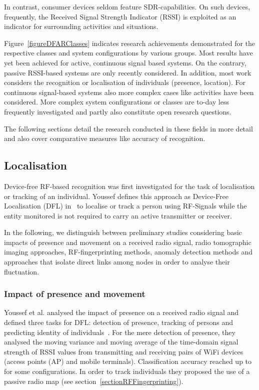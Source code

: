 \documentclass[journal]{IEEEtran}
\begin{document}
\begin{figure*}
In contrast, consumer devices seldom feature SDR-capabilities. 
On such devices, frequently, the Received Signal Strength Indicator (RSSI) is exploited as an indicator for surrounding activities and situations.

Figure~\ref{figureDFARClasses} indicates research achievements demonstrated for the respective classes and system configurations by various groups.
Most results have yet been achieved for active, continuous signal based systems. 
On the contrary, passive RSSI-based systems are only recently considered.
In addition, most work considers the recognition or localisation of individuals (presence, location). 
For continuous signal-based systems also more complex cases like activities have been considered. 
More complex system configurations or classes are to-day less frequently investigated and partly also constitute open research questions.

The following sections detail the research conducted in these fields in more detail and also cover comparative measures like accuracy of recognition.

\subsection{Localisation}
Device-free RF-based recognition was first investigated for the task of localisation or tracking of an individual.
Youssef defines this approach as Device-Free Localisation (DFL) in~\cite{Pervasive_Youssef_2007} to localise or track a person using RF-Signals while the entity monitored is not required to carry an active transmitter or receiver.

In the following, we distinguish between preliminary studies considering basic impacts of presence and movement on a received radio signal, radio tomographic imaging approaches, RF-fingerprinting methods, anomaly detection methods and approaches that isolate direct links among nodes in order to analyse their fluctuation.

\subsubsection{Impact of presence and movement}
Youssef et al. analysed the impact of presence on a received radio signal and defined three tasks for DFL: detection of presence, tracking of persons and predicting identity of individuals~\cite{Pervasive_Youssef_2007}.
For the mere detection of presence, they analysed the moving variance and moving average of the time-domain signal strength of RSSI values from transmitting and receiving pairs of WiFi devices (access points (AP) and mobile terminals).
Classification accuracy reached up to  for some configurations.
In order to track individuals they proposed the use of a passive radio map (see section~\ref{sectionRFFingerprinting}).


\end{figure*}
\end{document}
